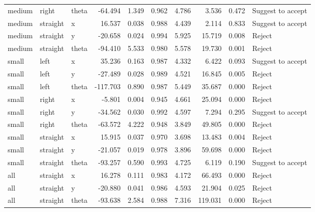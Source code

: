 \begin{table}[]
\begin{tabular}{@{}lllrrrrrrl@{}}
    medium & right     & theta           & -64.494  & 1.349    & 0.962    & 4.786     & 3.536     & 0.472   & Suggest to accept \\
    medium & straight  & x               & 16.537   & 0.038    & 0.988    & 4.439     & 2.114     & 0.833   & Suggest to accept \\
    medium & straight  & y               & -20.658  & 0.024    & 0.994    & 5.925     & 15.719    & 0.008   & Reject            \\
    medium & straight  & theta           & -94.410  & 5.533    & 0.980    & 5.578     & 19.730    & 0.001   & Reject            \\
    small  & left      & x               & 35.236   & 0.163    & 0.987    & 4.332     & 6.422     & 0.093   & Suggest to accept \\
    small  & left      & y               & -27.489  & 0.028    & 0.989    & 4.521     & 16.845    & 0.005   & Reject            \\
    small  & left      & theta           & -117.703 & 0.890    & 0.987    & 5.449     & 35.687    & 0.000   & Reject            \\
    small  & right     & x               & -5.801   & 0.004    & 0.945    & 4.661     & 25.094    & 0.000   & Reject            \\
    small  & right     & y               & -34.562  & 0.030    & 0.992    & 4.597     & 7.294     & 0.295   & Suggest to accept \\
    small  & right     & theta           & -63.572  & 4.222    & 0.948    & 3.849     & 49.805    & 0.000   & Reject            \\
    small  & straight  & x               & 15.915   & 0.037    & 0.970    & 3.698     & 13.483    & 0.004   & Reject            \\
    small  & straight  & y               & -21.057  & 0.019    & 0.978    & 3.896     & 59.698    & 0.000   & Reject            \\
    small  & straight  & theta           & -93.257  & 0.590    & 0.993    & 4.725     & 6.119     & 0.190   & Suggest to accept \\
    all    & straight  & x               & 16.278   & 0.111    & 0.983    & 4.172     & 66.493    & 0.000   & Reject            \\
    all    & straight  & y               & -20.880  & 0.041    & 0.986    & 4.593     & 21.904    & 0.025   & Reject            \\
    all    & straight  & theta           & -93.638  & 2.584    & 0.988    & 7.316     & 119.031   & 0.000   & Reject            \\

\end{tabular}
\end{table}

